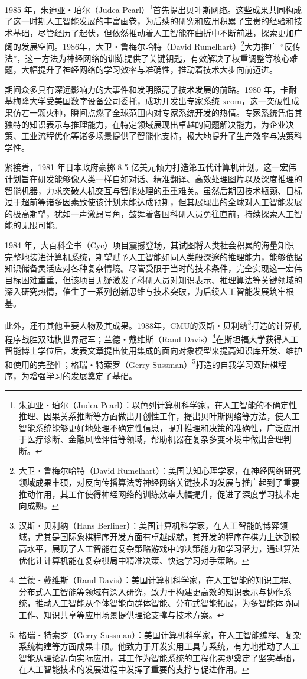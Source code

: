 1985 年，朱迪亚・珀尔（Judea Pearl）\footnote{朱迪亚・珀尔（Judea Pearl）：以色列计算机科学家，在人工智能的不确定性推理、因果关系推断等方面做出开创性工作，提出贝叶斯网络等方法，使人工智能系统能够更好地处理不确定性信息，提升推理和决策的准确性，广泛应用于医疗诊断、金融风险评估等领域，帮助机器在复杂多变环境中做出合理判断。}首先提出贝叶斯网络。这些成果共同构成了这一时期人工智能发展的丰富画卷，为后续的研究和应用积累了宝贵的经验和技术基础，尽管经历了起伏，但依然推动着人工智能在曲折中不断前进，探索更加广阔的发展空间。1986年，大卫・鲁梅尔哈特（David Rumelhart）\footnote{大卫・鲁梅尔哈特（David Rumelhart）：美国认知心理学家，在神经网络研究领域成果丰硕，对反向传播算法等神经网络关键技术的发展与推广起到了重要推动作用，其工作使得神经网络的训练效率大幅提升，促进了深度学习技术走向成熟。}大力推广 “反传法”，这一方法为神经网络的训练提供了关键钥匙，有效解决了权重调整等核心难题，大幅提升了神经网络的学习效率与准确性，推动着技术大步向前迈进。


期间众多具有深远影响力的大事件和发明照亮了技术发展的前路。1980 年，卡耐基梅隆大学受美国数字设备公司委托，成功开发出专家系统 xcom，这一突破性成果仿若一颗火种，瞬间点燃了全球范围内对专家系统开发的热情。专家系统凭借其独特的知识表示与推理能力，在特定领域展现出卓越的问题解决能力，为企业决策、工业流程优化等诸多场景提供了智能化支持，极大地提升了生产效率与决策科学性。


紧接着，1981 年日本政府豪掷 8.5 亿美元倾力打造第五代计算机计划。这一宏伟计划旨在研发能够像人类一样自如对话、精准翻译、高效处理图片以及深度推理的智能机器，力求突破人机交互与智能处理的重重难关。虽然后期因技术瓶颈、目标过于超前等诸多因素致使该计划未能达成预期，但其展现出的全球对人工智能发展的极高期望，犹如一声激昂号角，鼓舞着各国科研人员勇往直前，持续探索人工智能的无限可能。


1984 年，大百科全书（Cyc）项目震撼登场，其试图将人类社会积累的海量知识完整地装进计算机系统，期望赋予人工智能如同人类般深邃的推理能力，能够依据知识储备灵活应对各种复杂情境。尽管受限于当时的技术条件，完全实现这一宏伟目标困难重重，但该项目无疑激发了科研人员对知识表示、推理算法等关键领域的深入研究热情，催生了一系列创新思维与技术突破，为后续人工智能发展筑牢根基。


此外，还有其他重要人物及其成果。1988年，CMU的汉斯・贝利纳\footnote{汉斯・贝利纳（Hans Berliner）：美国计算机科学家，在人工智能的博弈领域，尤其是国际象棋程序开发方面有卓越成就，其开发的程序在棋力上达到较高水平，展现了人工智能在复杂策略游戏中的决策能力和学习潜力，通过算法优化让计算机能在复杂棋局中精准决策、快速学习对手策略。}打造的计算机程序战胜双陆棋世界冠军；兰德・戴维斯（Rand Davis）\footnote{兰德・戴维斯（Rand Davis）：美国计算机科学家，在人工智能的知识工程、分布式人工智能等领域有深入研究，致力于构建更高效的知识表示与协作系统，推动人工智能从个体智能向群体智能、分布式智能拓展，为多智能体协同工作、知识共享等应用场景提供理论支撑与技术方案。}在斯坦福大学获得人工智能博士学位后，发表文章提出使用集成的面向对象模型来提高知识库开发、维护和使用的完整性；格瑞・特索罗（Gerry Sussman）\footnote{格瑞・特索罗（Gerry Sussman）：美国计算机科学家，在人工智能编程、复杂系统构建等方面成果丰硕。他致力于开发实用工具与系统，有力地推动了人工智能从理论迈向实际应用，其工作为智能系统的工程化实现奠定了坚实基础，在人工智能技术的发展进程中发挥了重要的支撑与促进作用。}打造的自我学习双陆棋程序，为增强学习的发展奠定了基础。




